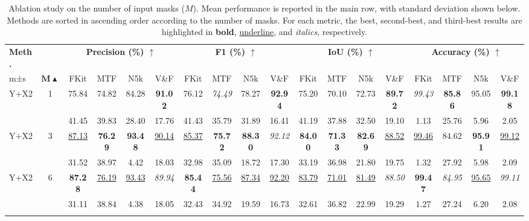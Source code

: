 \documentclass[preprint,12pt]{elsarticle}
\begin{document}
\begin{table}[!htbp]
\centering
\tiny
\setlength{\tabcolsep}{1.1pt} %
\caption{Ablation study on the number of input masks ($M$). Mean performance is reported in the main row, with standard deviation shown below. Methods are sorted in ascending order according to the number of masks. For each metric, the best, second-best, and third-best results are highlighted in \textbf{bold}, \uline{underline}, and \textit{italics}, respectively.}
\label{tab:masks_ablation_additional}
\begin{tabular}{lccccccccccccccccc}
\toprule
\textbf{Meth.} & &
\multicolumn{4}{c}{\textbf{Precision (\%) $\uparrow$}} & 
\multicolumn{4}{c}{\textbf{F1 (\%) $\uparrow$}} & 
\multicolumn{4}{c}{\textbf{IoU (\%) $\uparrow$}} & 
\multicolumn{4}{c}{\textbf{Accuracy (\%) $\uparrow$}} \\
\cmidrule(lr){3-6} \cmidrule(lr){7-10} \cmidrule(lr){11-14} \cmidrule(lr){15-18}
 m±s &  $\boldsymbol{M}\blacktriangle$ & FKit & MTF & N5k & V\&F & FKit & MTF & N5k & V\&F & FKit & MTF & N5k & V\&F & FKit & MTF & N5k & V\&F \\
\midrule
Y+X2 & 1 & 75.84 & 74.82 & 84.28 & \textbf{91.02} & 76.12 & \textit{74.49} & 78.27 & \textbf{92.94} & 75.20 & 70.10 & 72.73 & \textbf{89.72} & \textit{99.43}  & \textbf{85.86} & 95.05 & \textbf{99.18}  \\
& & 41.45 & 39.83 & 28.40 & 17.76 & 41.43 & 35.79 & 31.89 & 16.41 & 41.19 & 37.88 & 32.50 & 19.10 & 1.13 & 25.76 & 5.96 & 2.05 \\ \addlinespace[3pt]

\rowcolor{gray!12}
Y+X2 & 3 & \uline{87.13} & \textbf{76.29} & \textbf{93.48} & \uline{90.14} & \uline{85.37} & \textbf{75.72}  & \textbf{88.30} & \textit{92.12} & \textbf{84.00} & \textbf{71.33} & \textbf{82.69} & \uline{88.52} & \uline{99.46}  & 84.62 & \textbf{95.91} & \uline{99.12} \\\rowcolor{gray!12}
& & 31.52 & 38.97 & 4.42 & 18.03 & 32.98 & 35.09 & 18.72 & 17.30 & 33.19 & 36.98 & 21.80 & 19.75 & 1.32 & 27.92 & 5.98 & 2.09 \\  \addlinespace[3pt]

Y+X2 & 6 & \textbf{87.28} & \uline{76.19} & \uline{93.43} & \textit{89.94}  & \textbf{85.44} & \uline{75.56}  & \uline{87.34} & \uline{92.20} & \uline{83.79} & \uline{71.01} & \uline{81.49} & \textit{88.50} & \textbf{99.47} & \textit{84.95} & \uline{95.65} & \textit{99.11}  \\
& & 31.11 &  38.84 & 4.38 & 18.05 & 32.43 & 34.92 & 19.59 & 16.73 & 32.61 & 36.82 & 22.99 & 19.29 & 1.27 & 27.24 & 6.20 & 2.08 \\\addlinespace[3pt]


\end{tabular}
\end{table}
\end{document}
